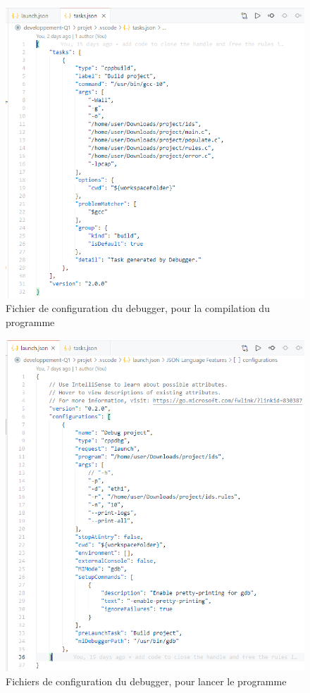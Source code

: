 \documentclass[a4paper]{article}
\begin{document}
\begin{figure}[H]
    \centering
    \includegraphics[width=0.85\linewidth]{images/task-json.PNG}
    \caption{Fichier de configuration du debugger, pour la compilation du programme}
    \label{fig:debugconfig1}
\end{figure}
\begin{figure}[H]
    \centering
    \includegraphics[width=0.85\linewidth]{images/launch-json.PNG}
    \caption{Fichiers de configuration du debugger, pour lancer le programme}
    \label{fig:debugconfig2}
\end{figure}
\end{document}
